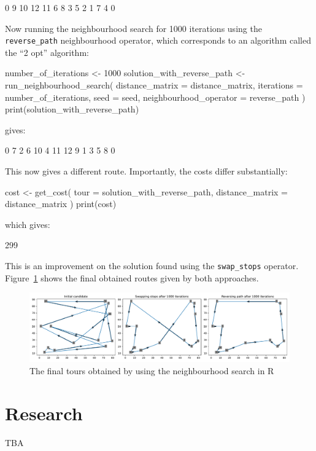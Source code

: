 \begin{Rout}
 [1]  0  9 10 12 11  6  8  3  5  2  1  7  4  0
\end{Rout}

Now running the neighbourhood search for 1000 iterations using the
\texttt{reverse_path} neighbourhood operator, which corresponds to
an algorithm called the ``2 opt'' algorithm: %

\begin{Rin}
number_of_iterations <- 1000
solution_with_reverse_path <- run_neighbourhood_search(
  distance_matrix = distance_matrix,
  iterations = number_of_iterations,
  seed = seed,
  neighbourhood_operator = reverse_path
)
print(solution_with_reverse_path)
\end{Rin}

gives:

\begin{Rout}
 [1]  0  7  2  6 10  4 11 12  9  1  3  5  8  0
\end{Rout}

This now gives a different route.
Importantly, the costs differ substantially:

\begin{Rin}
cost <- get_cost(
  tour = solution_with_reverse_path,
  distance_matrix = distance_matrix
)
print(cost)
\end{Rin}

which gives:

\begin{Rout}
[1] 299
\end{Rout}

This is an improvement on the solution found using the \texttt{swap_stops}
operator. Figure~\ref{fig:final-tsp-tours-r} shows the final obtained routes
given by both approaches.


\begin{figure}
    \begin{center}
        \includegraphics[width=\textwidth]{./assets/final-tsp-tours-with-R/main.pdf}
    \end{center}
    \caption{The final tours obtained by using the neighbourhood search in R}
    \label{fig:final-tsp-tours-r}
\end{figure}

\section{Research}\label{sec:research}

TBA
